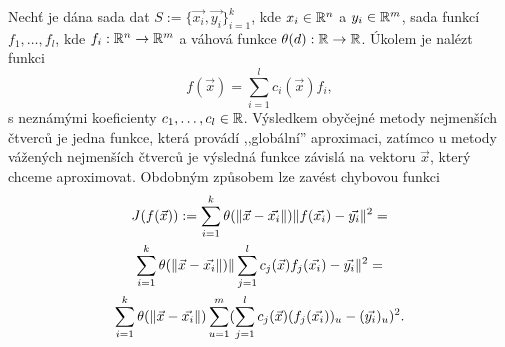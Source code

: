 Nechť je dána sada dat $S := \{\vec{x_i}, \vec{y_i}\}_{i = 1}^k$, kde $x_i \in \mathbb{R}^n$ a $y_i \in \mathbb{R}^m$, sada funkcí $f_1,\ldots,f_l$, kde $f_i: \mathbb{R}^n \rightarrow \mathbb{R}^m$ a váhová funkce $\theta(d): \mathbb{R} \rightarrow \mathbb{R}$. Úkolem je nalézt funkci
\begin{equation}
  \label{defi:wls}
  f(\vec{x}) = \sum_{i=1}^lc_i(\vec{x})f_i,
\end{equation}
s neznámými koeficienty $c_1,\ldots,c_l \in \mathbb{R}$. Výsledkem obyčejné metody nejmenších čtverců je jedna funkce, která provádí ,,globální'' aproximaci, zatímco u metody vážených nejmenších čtverců je výsledná funkce závislá na vektoru $\vec{x}$, který chceme aproximovat. Obdobným způsobem lze zavést chybovou funkci
\begin{multline}
  \label{defi:wls-min}
  J(f(\vec{x})) := \sum_{i=1}^k \theta(\|\vec{x} - \vec{x_i}\|)\|f(\vec{x_i}) - \vec{y_i}\|^2 =\\
  \sum_{i=1}^k\theta(\|\vec{x} - \vec{x_i}\|)\|\sum_{j=1}^l c_j(\vec{x})f_j(\vec{x_i}) - \vec{y_i}\|^2 =\\
  \sum_{i=1}^k\theta(\|\vec{x} - \vec{x_i}\|)\sum_{u=1}^m(\sum_{j=1}^l c_j(\vec{x})(f_j(\vec{x_i}))_u - (\vec{y_i})_u)^2.\\
\end{multline}

